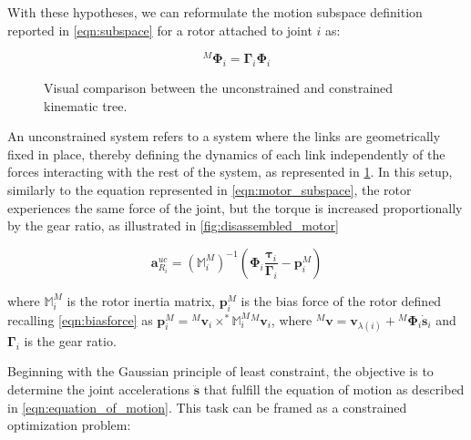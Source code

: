 With these hypotheses, we can reformulate the motion subspace definition reported in \cref{eqn:subspace} for a rotor attached to joint $i$ as:

\begin{equation}
    \label{eqn:motor_subspace}
    {} ^M \boldsymbol{\Phi} _i = \boldsymbol{\Gamma} _i \boldsymbol{\Phi} _i
\end{equation}


\begin{figure}
    \centering
    \caption{Visual comparison between the unconstrained and constrained kinematic tree.}
    \label{fig:uc_and_constr_tree}
\end{figure}

An unconstrained system refers to a system where the links are geometrically fixed in place, thereby defining the dynamics of each link independently of the forces interacting with the rest of the system, as represented in \cref{fig:uc_and_constr_tree}. In this setup, similarly to the equation represented in \cref{eqn:motor_subspace}, the rotor experiences the same force of the joint, but the torque is increased proportionally by the gear ratio, as illustrated in \cref{fig:disassembled_motor}

\begin{equation}
    \mathbf{a} ^{uc} _{R _i} = (\mathbb{M} ^M _i) ^{-1}(\boldsymbol{\Phi} _i \frac{\boldsymbol{\tau} _i}{\boldsymbol{\Gamma} _i} - \mathbf{p} ^M _i)
\end{equation}

where $\mathbb{M} ^M _i$ is the rotor inertia matrix, $\mathbf{p} ^M _i$ is the bias force of the rotor defined recalling \cref{eqn:biasforce} as  $\mathbf{p} ^M _i = {} ^M \mathbf{v} _i\times ^* \mathbb{M} ^M _i {} ^M \mathbf{v} _i$, where ${} ^M \mathbf{v} = \mathbf{v} _{\lambda (i)} + {} ^M \boldsymbol{\Phi} _i \dot{\mathbf{s}} _i$ and $\boldsymbol{\Gamma} _i$ is the gear ratio.

Beginning with the Gaussian principle of least constraint, the objective is to determine the joint accelerations $\ddot{\mathbf{s}}$ that fulfill the equation of motion as described in \cref{eqn:equation_of_motion}. This task can be framed as a constrained optimization problem:

